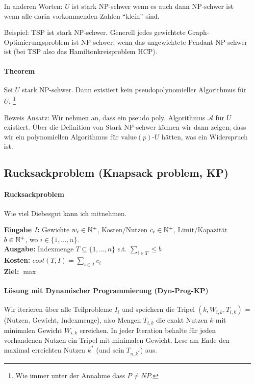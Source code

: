 In anderen Worten: $U$ ist stark NP-schwer wenn es auch dann NP-schwer ist wenn alle darin vorkommenden Zahlen ``klein'' sind.

Beispiel: TSP ist stark NP-schwer. Generell jedes gewichtete Graph-Optimierungsproblem ist NP-schwer, wenn das ungewichtete Pendant NP-schwer ist (bei TSP also das Hamiltonkreisproblem HCP).

\paragraph{Theorem}
Sei $U$ stark NP-schwer. Dann existiert kein pseudopolynomieller Algorithmus für $U$. \footnote{Wie immer unter der Annahme dass $P \neq NP$.}

Beweis Ansatz: Wir nehmen an, dass ein pseudo poly. Algorithmus $\mathcal{A}$ für $U$ existiert. Über die Definition von Stark NP-schwer können wir dann zeigen, dass wir ein polynomiellen Algorithmus für $\text{value}(p)\text{-}U$ hätten, was ein Widerspruch ist.


\subsection{Rucksackproblem (Knapsack problem, KP)}\label{algo-kp}

\paragraph{Rucksackproblem} Wie viel Diebesgut kann ich mitnehmen.

\textbf{Eingabe $I$:} Gewichte $w_i \in \mathbb{N}^+$, Kosten/Nutzen $c_i \in \mathbb{N}^+$, Limit/Kapazität $b \in \mathbb{N}^+$, wo $i \in \{ 1, \dots, n \} $. \\
\textbf{Ausgabe:} Indexmenge $T \subseteq \{ 1, \dots, n \}$ s.t. $\sum_{i \in T } \leq b$ \\
\textbf{Kosten:} $cost(T, I) = \sum_{i \in T} c_i$ \\
\textbf{Ziel:} $\max$

\paragraph{Lösung mit Dynamischer Programmierung (Dyn-Prog-KP)} Wir iterieren über alle Teilprobleme $I_i$ und speichern die Tripel
$(k, W_{i, k}, T_{i, k})$ = (Nutzen, Gewicht, Indexmenge), also Mengen $T_{i, k}$
die exakt Nutzen $k$ mit minimalen Gewicht $W_{i, k}$ erreichen.
In jeder Iteration behalte für jeden vorhandenen Nutzen ein Tripel mit minimalen Gewicht.
Lese am Ende den maximal erreichten Nutzen $k^*$ (und sein $T_{n, k^*}$) aus.

